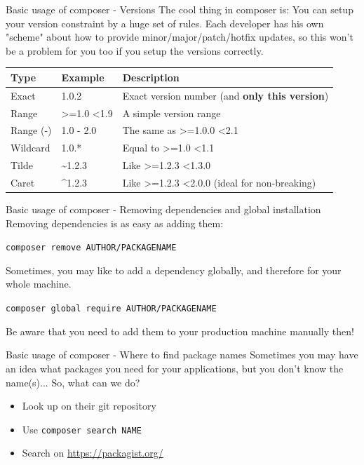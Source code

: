 \begin{frame}{Basic usage of composer - Versions}
	The cool thing in composer is: You can setup your version constraint by a huge set of rules. Each developer has his own "scheme" about how to provide minor/major/patch/hotfix updates, so this won't be a problem for you too if you setup the versions correctly. \pause
	
	\begin{tabular}{p{2cm} | p{4cm} | p{4cm}}
		Type &  Example & Description \\
		\hline \pause
		Exact & 1.0.2 & Exact version number (and \textbf{only this version}) \pause \\
			\hline \pause
		Range & \textgreater=1.0 \textless1.9 & A simple version range \pause \\
		\hline \pause
		Range (-) & 1.0 - 2.0 & The same as \textgreater=1.0.0 \textless2.1 \pause \\
		\hline \pause
		Wildcard & 1.0.* & Equal to \textgreater=1.0 \textless1.1 \pause \\
		\hline \pause
		Tilde & \textasciitilde1.2.3 & Like \textgreater=1.2.3 \textless1.3.0 \pause \\
		\hline \pause
		Caret & \textasciicircum1.2.3 & Like \textgreater=1.2.3 \textless2.0.0 (ideal for non-breaking) \\
		\hline
	\end{tabular}
\end{frame}

\begin{frame}{Basic usage of composer - Removing dependencies and global installation}
	Removing dependencies is as easy as adding them:
	
	 \texttt{composer remove AUTHOR/PACKAGENAME}\pause
	 
	 
	 Sometimes, you may like to add a dependency globally, and therefore for your whole machine. 
	 
	 \texttt{composer global require AUTHOR/PACKAGENAME}\pause
	 
	 Be aware that you need to add them to your production machine manually then!
\end{frame}

\begin{frame}{Basic usage of composer - Where to find package names}
	Sometimes you may have an idea what packages you need for your applications, but you don't know the name(s)... So, what can we do?\pause
	
	\begin{itemize}
		\item Look up on their git repository \pause
		\item Use \texttt{composer search NAME} \pause
		\item Search on \url{https://packagist.org/}
	\end{itemize}
\end{frame}

